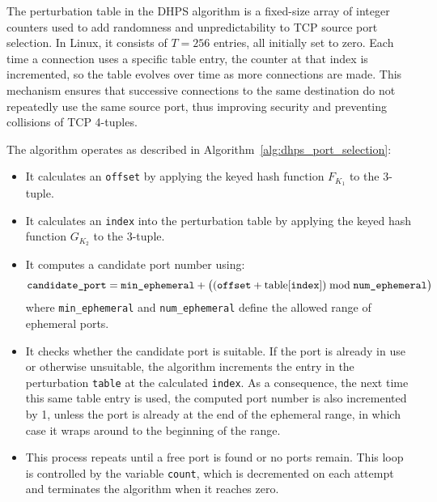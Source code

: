 \documentclass{report}
\begin{document}
The \alert{perturbation table} in the DHPS algorithm is a fixed-size array of integer counters used to add randomness and unpredictability to TCP source port selection. In Linux, it consists of $T = 256$ entries, all initially set to zero. Each time a connection uses a specific table entry, the counter at that index is incremented, so the table evolves over time as more connections are made. This mechanism ensures that successive connections to the same destination do not repeatedly use the same source port, thus improving security and preventing collisions of TCP 4-tuples.

The algorithm operates as described in Algorithm~\ref{alg:dhps_port_selection}:
\begin{itemize}
	\item It calculates an \texttt{offset} by applying the keyed hash function \( F_{K_1} \) to the 3-tuple.
	\item It calculates an \texttt{index} into the perturbation table by applying the keyed hash function \( G_{K_2} \) to the 3-tuple.
	\item It computes a candidate port number using:
	\[
		\texttt{candidate\_port} = \texttt{min\_ephemeral} + \bigl((\texttt{offset} + \text{table[\texttt{index}]}) \bmod \texttt{num\_ephemeral}\bigr)
	\]
	where \texttt{min\_ephemeral} and \texttt{num\_ephemeral} define the allowed range of ephemeral ports.
	\item It checks whether the candidate port is suitable. If the port is already in use or otherwise unsuitable, the algorithm increments the entry in the perturbation \texttt{table} at the calculated \texttt{index}. As a consequence, the next time this same table entry is used, the computed port number is also \alert{incremented by 1}, unless the port is already at the end of the ephemeral range, in which case it wraps around to the beginning of the range.
	\item This process \alert{repeats until} a free port is found or no ports remain. This loop is controlled by the variable \texttt{count}, which is decremented on each attempt and terminates the algorithm when it reaches zero.
\end{itemize}
\begin{center}
	\begin{minipage}[t]{0.5\textwidth}
		\vspace{0cm}

		
	\end{minipage}
\end{center}
\vspace{0.5cm}
\end{document}
